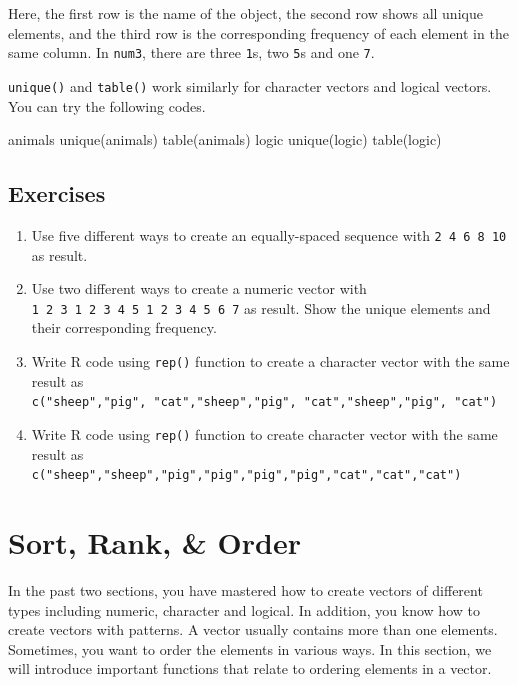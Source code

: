 \documentclass[
]{book}
\newenvironment{Shaded}{\begin{snugshade}}{\end{snugshade}}
\newcommand{\FunctionTok}[1]{\textcolor[rgb]{0.00,0.00,0.00}{#1}}
\newcommand{\NormalTok}[1]{#1}
\begin{document}
Here, the first row is the name of the object, the second row shows all unique elements, and the third row is the corresponding frequency of each element in the same column. In \texttt{num3}, there are three \texttt{1}s, two \texttt{5}s and one \texttt{7}.

\texttt{unique()} and \texttt{table()} work similarly for character vectors and logical vectors. You can try the following codes.

\begin{Shaded}
\begin{Highlighting}[]
\NormalTok{animals}
\FunctionTok{unique}\NormalTok{(animals)}
\FunctionTok{table}\NormalTok{(animals)}
\NormalTok{logic}
\FunctionTok{unique}\NormalTok{(logic)}
\FunctionTok{table}\NormalTok{(logic)}
\end{Highlighting}
\end{Shaded}

\hypertarget{exercises-5}{%
\subsection{Exercises}\label{exercises-5}}

\begin{enumerate}
\def\labelenumi{\arabic{enumi}.}
\item
  Use five different ways to create an equally-spaced sequence with \texttt{2\ 4\ 6\ 8\ 10} as result.
\item
  Use two different ways to create a numeric vector with \texttt{1\ 2\ 3\ 1\ 2\ 3\ 4\ 5\ 1\ 2\ 3\ 4\ 5\ 6\ 7} as result. Show the unique elements and their corresponding frequency.
\item
  Write R code using \texttt{rep()} function to create a character vector with the same result as \texttt{c("sheep","pig",\ "cat","sheep","pig",\ "cat","sheep","pig",\ "cat")}
\item
  Write R code using \texttt{rep()} function to create character vector with the same result as \texttt{c("sheep","sheep","pig","pig","pig","pig","cat","cat","cat")}
\end{enumerate}

\hypertarget{sort-vector}{%
\section{Sort, Rank, \& Order}\label{sort-vector}}

In the past two sections, you have mastered how to create vectors of different types including numeric, character and logical. In addition, you know how to create vectors with patterns. A vector usually contains more than one elements. Sometimes, you want to order the elements in various ways. In this section, we will introduce important functions that relate to ordering elements in a vector.
\end{document}

